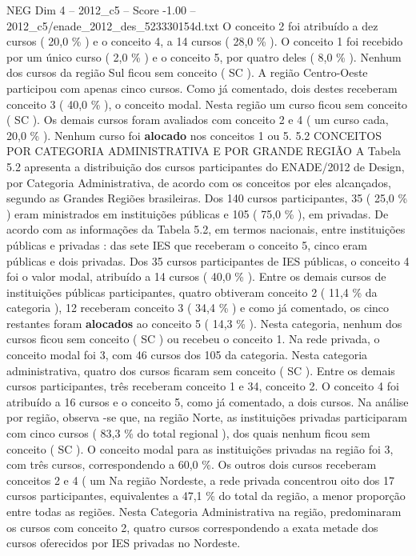 \begin{textsample}{NEG Dim 4 – 2012\_c5 – Score -1.00 – 2012\_c5/enade\_2012\_des\_523330154d.txt}
O conceito 2 foi atribuído a dez cursos ( 20,0 \% ) e o conceito 4, a 14 cursos ( 28,0 \% ).
O conceito 1 foi recebido por um único curso ( 2,0 \% ) e o conceito 5, por quatro deles ( 8,0 \% ).
Nenhum dos cursos da região Sul ficou sem conceito ( SC ).
A região Centro-Oeste participou com apenas cinco cursos.
Como já comentado, dois destes receberam conceito 3 ( 40,0 \% ), o conceito modal.
Nesta região um curso ficou sem conceito ( SC ).
Os demais cursos foram avaliados com conceito 2 e 4 ( um curso cada, 20,0 \% ).
Nenhum curso foi \textbf{alocado} nos conceitos 1 ou 5. 5.2 CONCEITOS POR CATEGORIA ADMINISTRATIVA E POR GRANDE REGIÃO A Tabela 5.2 apresenta a distribuição dos cursos participantes do ENADE/2012 de Design, por Categoria Administrativa, de acordo com os conceitos por eles alcançados, segundo as Grandes Regiões brasileiras.
Dos 140 cursos participantes, 35 ( 25,0 \% ) eram ministrados em instituições públicas e 105 ( 75,0 \% ), em privadas.
De acordo com as informações da Tabela 5.2, em termos nacionais, entre instituições públicas e privadas : das sete IES que receberam o conceito 5, cinco eram públicas e dois privadas.
Dos 35 cursos participantes de IES públicas, o conceito 4 foi o valor modal, atribuído a 14 cursos ( 40,0 \% ).
Entre os demais cursos de instituições públicas participantes, quatro obtiveram conceito 2 ( 11,4 \% da categoria ), 12 receberam conceito 3 ( 34,4 \% ) e como já comentado, os cinco restantes foram \textbf{alocados} ao conceito 5 ( 14,3 \% ).
Nesta categoria, nenhum dos cursos ficou sem conceito ( SC ) ou recebeu o conceito 1.
Na rede privada, o conceito modal foi 3, com 46 cursos dos 105 da categoria.
Nesta categoria administrativa, quatro dos cursos ficaram sem conceito ( SC ).
Entre os demais cursos participantes, três receberam conceito 1 e 34, conceito 2.
O conceito 4 foi atribuído a 16 cursos e o conceito 5, como já comentado, a dois cursos.
Na análise por região, observa -se que, na região Norte, as instituições privadas participaram com cinco cursos ( 83,3 \% do total regional ), dos quais nenhum ficou sem conceito ( SC ).
O conceito modal para as instituições privadas na região foi 3, com três cursos, correspondendo a 60,0 \%.
Os outros dois cursos receberam conceitos 2 e 4 ( um Na região Nordeste, a rede privada concentrou oito dos 17 cursos participantes, equivalentes a 47,1 \% do total da região, a menor proporção entre todas as regiões.
Nesta Categoria Administrativa na região, predominaram os cursos com conceito 2, quatro cursos correspondendo a exata metade dos cursos oferecidos por IES privadas no Nordeste.

\end{textsample}
